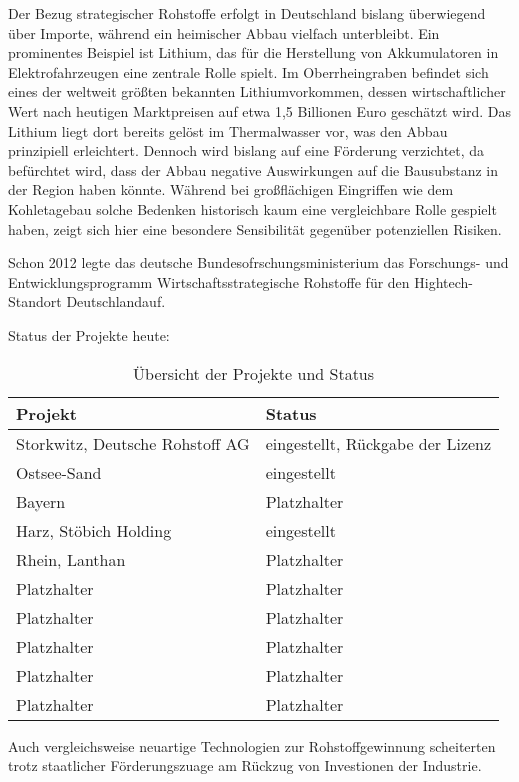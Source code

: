 \documentclass[12pt,a4paper,oneside]{book} %
\begin{document}
Der Bezug strategischer Rohstoffe erfolgt in Deutschland bislang überwiegend über Importe, während ein heimischer Abbau vielfach unterbleibt. Ein prominentes Beispiel ist Lithium, das für die Herstellung von Akkumulatoren in Elektrofahrzeugen eine zentrale Rolle spielt. Im Oberrheingraben befindet sich eines der weltweit größten bekannten Lithiumvorkommen, dessen wirtschaftlicher Wert nach heutigen Marktpreisen auf etwa 1,5 Billionen Euro geschätzt wird. Das Lithium liegt dort bereits gelöst im Thermalwasser vor, was den Abbau prinzipiell erleichtert. Dennoch wird bislang auf eine Förderung verzichtet, da befürchtet wird, dass der Abbau negative Auswirkungen auf die Bausubstanz in der Region haben könnte. Während bei großflächigen Eingriffen wie dem Kohletagebau solche Bedenken historisch kaum eine vergleichbare Rolle gespielt haben, zeigt sich hier eine besondere Sensibilität gegenüber potenziellen Risiken.


Schon 2012 legte das deutsche Bundesofrschungsministerium das Forschungs- und Entwicklungsprogramm \glqq Wirtschaftsstrategische Rohstoffe für den Hightech-Standort Deutschland\grqq auf.

Status der Projekte heute:

\begin{table}[ht]
	\centering
	\begin{tabular}{p{6cm} p{6cm}}
		\toprule
		\textbf{Projekt} & \textbf{Status} \\
		\midrule
		Storkwitz, Deutsche Rohstoff AG & eingestellt, Rückgabe der Lizenz \\
		Ostsee-Sand & eingestellt \\
		Bayern & Platzhalter \\
		Harz, Stöbich Holding & eingestellt \\
		Rhein, Lanthan & Platzhalter \\
		Platzhalter & Platzhalter \\
		Platzhalter & Platzhalter \\
		Platzhalter & Platzhalter \\
		Platzhalter & Platzhalter \\
		Platzhalter & Platzhalter \\
		\bottomrule
	\end{tabular}
	\caption{Übersicht der Projekte und Status}
	\label{tab:projekt_status}
\end{table}

Auch vergleichsweise neuartige Technologien zur Rohstoffgewinnung scheiterten trotz staatlicher Förderungszuage am Rückzug von Investionen der Industrie.
\end{document}
